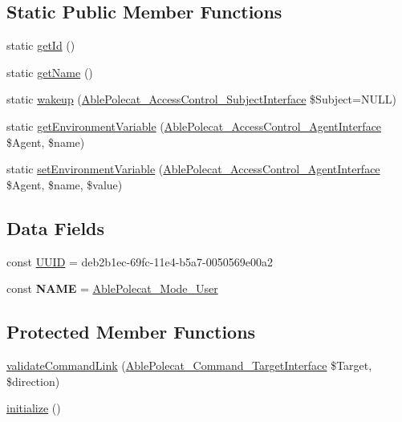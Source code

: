 \subsection*{Static Public Member Functions}
\begin{DoxyCompactItemize}
\item 
static \hyperlink{class_able_polecat___mode___user_acfaa3a96d0cb5a4c0d4d710dcba41e9e}{get\+Id} ()
\item 
static \hyperlink{class_able_polecat___mode___user_a4ef9bd37ba3ce8a13c1e8bcf4f72a630}{get\+Name} ()
\item 
static \hyperlink{class_able_polecat___mode___user_a3f2135f6ad45f51d075657f6d20db2cd}{wakeup} (\hyperlink{interface_able_polecat___access_control___subject_interface}{Able\+Polecat\+\_\+\+Access\+Control\+\_\+\+Subject\+Interface} \$Subject=N\+U\+L\+L)
\item 
static \hyperlink{class_able_polecat___mode___user_a04e7e0f41da8037ae797868b61b6df77}{get\+Environment\+Variable} (\hyperlink{interface_able_polecat___access_control___agent_interface}{Able\+Polecat\+\_\+\+Access\+Control\+\_\+\+Agent\+Interface} \$Agent, \$name)
\item 
static \hyperlink{class_able_polecat___mode___user_a68bdefd00518f09963ea3fa95cd2a242}{set\+Environment\+Variable} (\hyperlink{interface_able_polecat___access_control___agent_interface}{Able\+Polecat\+\_\+\+Access\+Control\+\_\+\+Agent\+Interface} \$Agent, \$name, \$value)
\end{DoxyCompactItemize}
\subsection*{Data Fields}
\begin{DoxyCompactItemize}
\item 
const \hyperlink{class_able_polecat___mode___user_a74b892c8c0b86bf9d04c5819898c51e7}{U\+U\+I\+D} = \textquotesingle{}deb2b1ec-\/69fc-\/11e4-\/b5a7-\/0050569e00a2\textquotesingle{}
\item 
\hypertarget{class_able_polecat___mode___user_a244352f035b82b20b0efa506167fd862}{}const {\bfseries N\+A\+M\+E} = \textquotesingle{}\hyperlink{class_able_polecat___mode___user}{Able\+Polecat\+\_\+\+Mode\+\_\+\+User}\textquotesingle{}\label{class_able_polecat___mode___user_a244352f035b82b20b0efa506167fd862}

\end{DoxyCompactItemize}
\subsection*{Protected Member Functions}
\begin{DoxyCompactItemize}
\item 
\hyperlink{class_able_polecat___mode___user_a37906da60d0165610266b97b07bc5267}{validate\+Command\+Link} (\hyperlink{interface_able_polecat___command___target_interface}{Able\+Polecat\+\_\+\+Command\+\_\+\+Target\+Interface} \$Target, \$direction)
\item 
\hyperlink{class_able_polecat___mode___user_a91098fa7d1917ce4833f284bbef12627}{initialize} ()
\end{DoxyCompactItemize}


